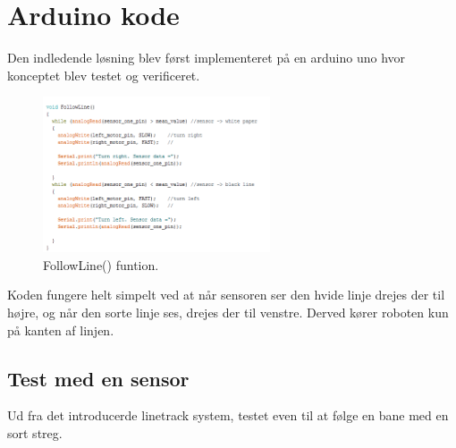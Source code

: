 \section{Arduino kode}
Den indledende løsning blev først implementeret på en arduino uno hvor konceptet blev testet og verificeret.

\begin{figure}[h!]
  \centering
  \includegraphics[width=0.6\textwidth]{figures/followLine2.png}
  \caption{FollowLine() funtion.}
  \label{follow_line_kode}
\end{figure}

Koden fungere helt simpelt ved at når sensoren ser den hvide linje drejes der til højre, og når den sorte linje ses, drejes der til venstre. Derved kører roboten kun på kanten af linjen.

\subsection{Test med en sensor}
Ud fra det introducerde linetrack system, testet even til at følge en bane med en sort streg.
